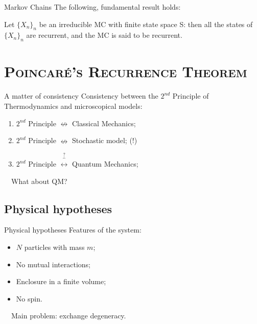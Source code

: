 \documentclass[xcolor=x11names, compress]{beamer}
\renewcommand{\(}{\begin{columns}}
\renewcommand{\)}{\end{columns}}
\newcommand{\<}[1]{\begin{column}{#1}}
\renewcommand{\>}{\end{column}}
\theoremstyle{definition}
\theoremstyle{plain}
\begin{document}
\begin{frame}{Markov Chains}
The following, fundamental result holds:
\begin{theorem}\label{thm2}
Let $\{X_n\}_n$ be an irreducible MC with finite state space S: then all the states of $\{X_n\}_n$ are recurrent, and the MC is said to be recurrent.
\end{theorem}

\end{frame}

\section{\scshape Poincar\'e's Recurrence Theorem}
\begin{frame}{A matter of consistency}
\large{Consistency between the $2^{nd}$ Principle of Thermodynamics and microscopical models:\\}
\begin{enumerate}
\item$2^{nd}$ Principle $\nleftrightarrow$ Classical Mechanics;
\item$2^{nd}$ Principle $\nleftrightarrow$ Stochastic model; (!)
\item$2^{nd}$ Principle $\overbrace{\longleftrightarrow}^{?}$ Quantum Mechanics;
\end{enumerate}
$\quad$\newline What about QM?
\end{frame}

\subsection{Physical hypotheses}
\begin{frame}{Physical hypotheses}
\large{Features of the system:}
\begin{itemize}
\item $N$ particles with mass $m$;
\item No mutual interactions;
\item Enclosure in a finite volume;
\item No spin.
\end{itemize}
$\quad$\newline Main problem: exchange degeneracy.
\end{frame}
\end{document}
